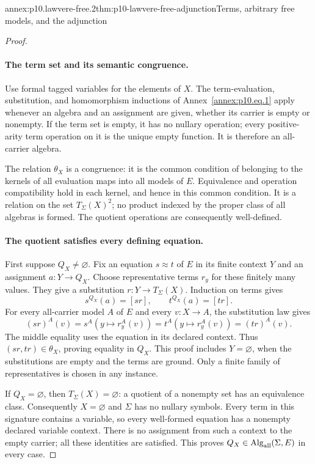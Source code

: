 \begin{annexitem}{annex:p10.lawvere-free.2}{thm:p10-lawvere-free-adjunction}{Terms, arbitrary free models, and the adjunction}
\begin{proof}
\paragraph{The term set and its semantic congruence.}
Use formal tagged variables for the elements of \(X\).
The term-evaluation, substitution, and homomorphism inductions of
Annex~\ref{annex:p10.eq.1} apply whenever an algebra and an assignment
are given, whether its carrier is empty or nonempty.
If the term set is empty, it has no nullary operation; every
positive-arity term operation on it is the unique empty function.
It is therefore an all-carrier algebra.

The relation \(\theta_X\) is a congruence: it is the common condition
of belonging to the kernels of all evaluation maps into all models of
\(E\).  Equivalence and operation compatibility hold in each kernel,
and hence in this common condition.
It is a relation on the set \(T_\Sigma(X)^2\); no product indexed by
the proper class of all algebras is formed.
The quotient operations are consequently well-defined.

\paragraph{The quotient satisfies every defining equation.}
First suppose \(Q_X\ne\varnothing\).
Fix an equation \(s\approx t\) of \(E\) in its finite context \(Y\)
and an assignment \(a:Y\to Q_X\).
Choose representative terms \(r_y\) for these finitely many values.
They give a substitution \(r:Y\to T_\Sigma(X)\).
Induction on terms gives
\[
 s^{Q_X}(a)=[s r],\qquad t^{Q_X}(a)=[t r].
\]
For every all-carrier model \(A\) of \(E\) and every \(v:X\to A\),
the substitution law gives
\[
 (s r)^A(v)=s^A(y\mapsto r_y^A(v))
           =t^A(y\mapsto r_y^A(v))=(t r)^A(v).
\]
The middle equality uses the equation in its declared context.
Thus \((s r,t r)\in\theta_X\), proving equality in \(Q_X\).
This proof includes \(Y=\varnothing\), when the substitutions are empty
and the terms are ground.
Only a finite family of representatives is chosen in any instance.

If \(Q_X=\varnothing\), then \(T_\Sigma(X)=\varnothing\): a quotient
of a nonempty set has an equivalence class.
Consequently \(X=\varnothing\) and \(\Sigma\) has no nullary symbols.
Every term in this signature contains a variable, so every well-formed
equation has a nonempty declared variable context.
There is no assignment from such a context to the empty carrier;
all these identities are satisfied.
This proves \(Q_X\in\operatorname{Alg}_{\rm all}(\Sigma,E)\) in every case.


\end{proof}
\end{annexitem}
